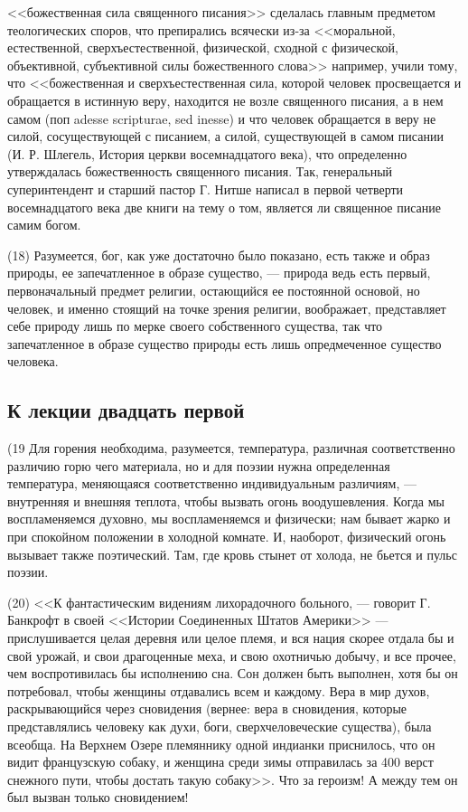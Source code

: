 \documentclass[12pt]{article}
\begin{document}
<<божественная сила священного писания>>  сделалась главным предметом теологических споров, что препирались всячески из-за <<моральной, естественной, сверхъестественной, физической, сходной с физической, объективной, субъективной силы божественного слова>>  например, учили тому, что <<божественная и сверхъестественная сила, которой человек просвещается и обращается в истинную веру, находится не возле священного писания, а в нем самом (поп adesse scripturae, sed inesse) и что человек обращается в веру не силой, сосуществующей с писанием, а силой, существующей в самом писании (И. Р. Шлегель, История церкви восемнадцатого века), что определенно утверждалась божественность священного писания. Так, генеральный суперинтендент и старший пастор Г. Нитше написал в первой четверти восемнадцатого века две книги на тему о том, является ли священное писание самим богом. 

(18) Разумеется, бог, как уже достаточно было показано, есть также и образ природы, ее запечатленное в образе существо, --- природа ведь есть первый, первоначальный предмет религии, остающийся ее постоянной основой, но человек, и именно стоящий на точке зрения религии, воображает, представляет себе природу лишь по мерке своего собственного существа, так что запечатленное в образе существо природы есть лишь опредмеченное существо человека. 

\subsection*{К лекции двадцать первой}

(19 Для горения необходима, разумеется, температура, различная соответственно различию горю чего материала, но и для поэзии нужна определенная температура, меняющаяся соответственно индивидуальным различиям, --- внутренняя и внешняя теплота, чтобы вызвать огонь воодушевления. Когда мы воспламеняемся духовно, мы воспламеняемся и физически; нам бывает жарко и при спокойном положении в холодной комнате. И, наоборот, физический огонь вызывает также поэтический. Там, где кровь стынет от холода, не бьется и пульс поэзии. 

(20) <<К фантастическим видениям лихорадочного больного, --- говорит Г. Банкрофт в своей <<Истории Соединенных Штатов Америки>>  --- прислушивается целая деревня или целое племя, и вся нация скорее отдала бы и свой урожай, и свои драгоценные меха, и свою охотничью добычу, и все прочее, чем воспротивилась бы исполнению сна. Сон должен быть выполнен, хотя бы он потребовал, чтобы женщины отдавались всем и каждому. Вера в мир духов, раскрывающийся через сновидения (вернее: вера в сновидения, которые представлялись человеку как духи, боги, сверхчеловеческие существа), была всеобща. На Верхнем Озере племяннику одной индианки приснилось, что он видит французскую собаку, и женщина среди зимы отправилась за 400 верст снежного пути, чтобы достать такую собаку>>. Что за героизм! А между тем он был вызван только сновидением! 
\end{document}
